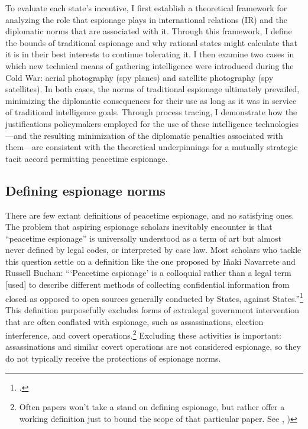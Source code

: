 \documentclass[12pt]{extarticle}
\begin{document}
To evaluate each state's incentive, I first establish a theoretical framework for analyzing the role that espionage plays in international relations (IR) and the diplomatic norms that are associated with it. Through this framework, I define the bounds of traditional espionage and why rational states might calculate that it is in their best interests to continue tolerating it. I then examine two cases in which new technical means of gathering intelligence were introduced during the Cold War: aerial photography (spy planes) and satellite photography (spy satellites). In both cases, the norms of traditional espionage ultimately prevailed, minimizing the diplomatic consequences for their use as long as it was in service of traditional intelligence goals. Through process tracing, I demonstrate how the justifications policymakers employed for the use of these intelligence technologies---and the resulting minimization of the diplomatic penalties associated with them---are consistent with the theoretical underpinnings for a mutually strategic tacit accord permitting peacetime espionage.


\subsection{Defining espionage norms}
There are few extant definitions of peacetime espionage, and no satisfying ones. The problem that aspiring espionage scholars inevitably encounter is that \enquote{peacetime espionage} is universally understood as a term of art but almost never defined by legal codes, or interpreted by case law. Most scholars who tackle this question settle on a definition like the one proposed by I\~{n}aki Navarrete and Russell Buchan: \enquote{\enquote{Peacetime espionage} is a colloquial rather than a legal term [used] to describe different methods of collecting confidential information from closed as opposed to open sources \textelp{} generally conducted by States, against States.}\footcite[901-902]{navarrete_out_2019} This definition purposefully excludes forms of extralegal government intervention that are often conflated with espionage, such as assassinations, election interference, and covert operations.\footnote{Often papers won't take a stand on defining espionage, but rather offer a working definition just to bound the scope of that particular paper. See \cite[600]{radsan_unresolved_2007}, \cite[2]{kapp_spying_2007})} Excluding these activities is important: assassinations and similar covert operations are not considered espionage, so they do not typically receive the protections of espionage norms.
\end{document}
